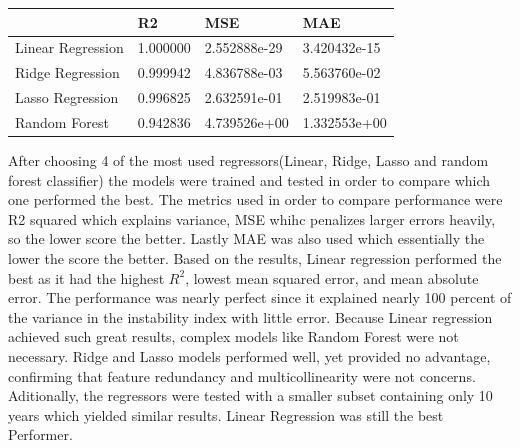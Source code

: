 \documentclass[
  letterpaper,
  DIV=11,
  numbers=noendperiod]{scrartcl}
\begin{document}
\begin{longtable}[]{@{}llll@{}}
\toprule\noalign{}
& R2 & MSE & MAE \\
\midrule\noalign{}
\endhead
\bottomrule\noalign{}
\endlastfoot
Linear Regression & 1.000000 & 2.552888e-29 & 3.420432e-15 \\
Ridge Regression & 0.999942 & 4.836788e-03 & 5.563760e-02 \\
Lasso Regression & 0.996825 & 2.632591e-01 & 2.519983e-01 \\
Random Forest & 0.942836 & 4.739526e+00 & 1.332553e+00 \\
\end{longtable}

After choosing 4 of the most used regressors(Linear, Ridge, Lasso and
random forest classifier) the models were trained and tested in order to
compare which one performed the best. The metrics used in order to
compare performance were R2 squared which explains variance, MSE whihc
penalizes larger errors heavily, so the lower score the better. Lastly
MAE was also used which essentially the lower the score the better.
Based on the results, Linear regression performed the best as it had the
highest \(R^2\), lowest mean squared error, and mean absolute error. The
performance was nearly perfect since it explained nearly 100 percent of
the variance in the instability index with little error. Because Linear
regression achieved such great results, complex models like Random
Forest were not necessary. Ridge and Lasso models performed well, yet
provided no advantage, confirming that feature redundancy and
multicollinearity were not concerns. Aditionally, the regressors were
tested with a smaller subset containing only 10 years which yielded
similar results. Linear Regression was still the best Performer.
\end{document}
